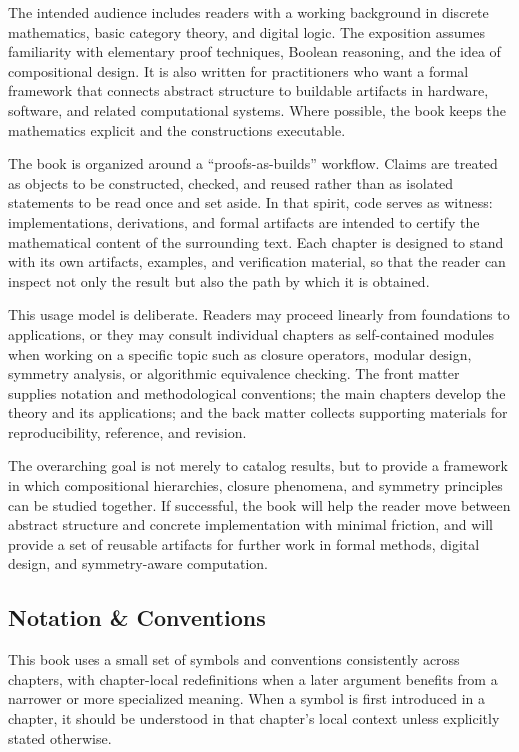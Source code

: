 \documentclass[11pt]{article}
\begin{document}
The intended audience includes readers with a working background in discrete mathematics, basic category theory, and digital logic. The exposition assumes familiarity with elementary proof techniques, Boolean reasoning, and the idea of compositional design. It is also written for practitioners who want a formal framework that connects abstract structure to buildable artifacts in hardware, software, and related computational systems. Where possible, the book keeps the mathematics explicit and the constructions executable.

The book is organized around a ``proofs-as-builds'' workflow. Claims are treated as objects to be constructed, checked, and reused rather than as isolated statements to be read once and set aside. In that spirit, code serves as witness: implementations, derivations, and formal artifacts are intended to certify the mathematical content of the surrounding text. Each chapter is designed to stand with its own artifacts, examples, and verification material, so that the reader can inspect not only the result but also the path by which it is obtained.

This usage model is deliberate. Readers may proceed linearly from foundations to applications, or they may consult individual chapters as self-contained modules when working on a specific topic such as closure operators, modular design, symmetry analysis, or algorithmic equivalence checking. The front matter supplies notation and methodological conventions; the main chapters develop the theory and its applications; and the back matter collects supporting materials for reproducibility, reference, and revision.

The overarching goal is not merely to catalog results, but to provide a framework in which compositional hierarchies, closure phenomena, and symmetry principles can be studied together. If successful, the book will help the reader move between abstract structure and concrete implementation with minimal friction, and will provide a set of reusable artifacts for further work in formal methods, digital design, and symmetry-aware computation.


\subsection{Notation \& Conventions}

This book uses a small set of symbols and conventions consistently across chapters, with chapter-local redefinitions when a later argument benefits from a narrower or more specialized meaning. When a symbol is first introduced in a chapter, it should be understood in that chapter's local context unless explicitly stated otherwise.
\end{document}
